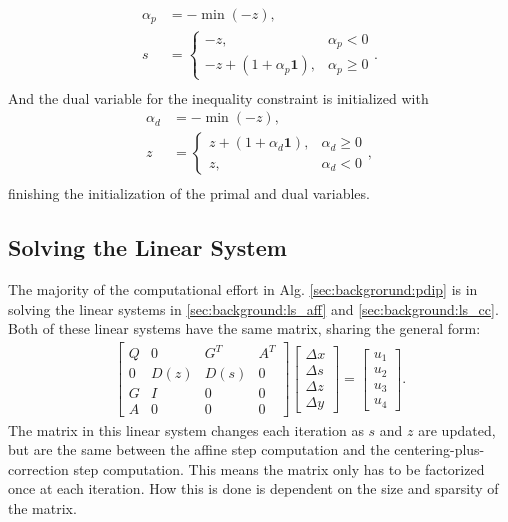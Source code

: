 \begin{align}
    \alpha_p &= - \min(-z), \\ 
    s &= \begin{cases} -z, & \alpha_p < 0 \\ 
                       -z + (1 + \alpha_p \mathbf{1}), & \alpha_p \geq 0
                       \end{cases}. \\ 
\end{align}
And the dual variable for the inequality constraint is initialized with 
\begin{align}
    \alpha_d &= - \min(-z), \\ 
    z &= \begin{cases} z + (1 + \alpha_d \mathbf{1}), & \alpha_d \geq 0 \\ 
                       z, & \alpha_d < 0
                       \end{cases}, \\ 
\end{align}
finishing the initialization of the primal and dual variables.
%
%
\subsection{Solving the Linear System}
\label{sec:background:solve_ls}
%
%
The majority of the computational effort in Alg. \ref{sec:backgrorund:pdip} is in solving the linear systems in \eqref{sec:background:ls_aff} and \eqref{sec:background:ls_cc}. Both of these linear systems have the same matrix, sharing the general form:
\begin{align}
    \begin{bmatrix}
        Q & 0 & G^{T} & A^{T} \\
        0 & D(z) & D(s) & 0 \\
        G & I & 0 & 0 \\
        A & 0 & 0 & 0
    \end{bmatrix} 
    \begin{bmatrix}
        \Delta x \\
        \Delta s \\
        \Delta z \\
        \Delta y
    \end{bmatrix}
    = \begin{bmatrix}
        u_1 \\ u_2 \\ u_3 \\ u_4
        \end{bmatrix}. \label{sec:background:ls_general}
\end{align}
The matrix in this linear system changes each iteration as $s$ and $z$ are updated, but are the same between the affine step computation and the centering-plus-correction step computation. This means the matrix only has to be factorized once at each iteration. How this is done is dependent on the size and sparsity of the matrix.
%
